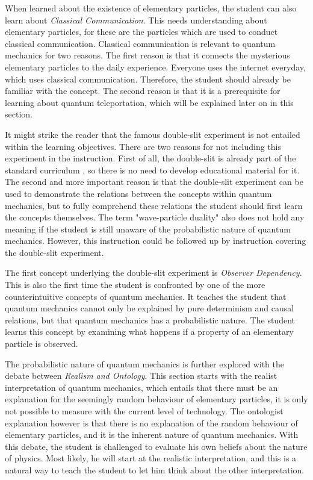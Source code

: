\documentclass[11pt,twoside]{report} %
\begin{document}
When learned about the existence of elementary particles, the student can also learn about \emph{Classical Communication}. This needs understanding about elementary particles, for these are the particles which are used to conduct classical communication. Classical communication is relevant to quantum mechanics for two reasons. The first reason is that it connects the mysterious elementary particles to the daily experience. Everyone uses the internet everyday, which uses classical communication. Therefore, the student should already be familiar with the concept. The second reason is that it is a prerequisite for learning about quantum teleportation, which will be explained later on in this section.

It might strike the reader that the famous double-slit experiment is not entailed within the learning objectives. There are two reasons for not including this experiment in the instruction. First of all, the double-slit is already part of the standard curriculum \cite{eindexamen2015}, so there is no need to develop educational material for it. The second and more important reason is that the double-slit experiment can be used to demonstrate the relations between the concepts within quantum mechanics, but to fully comprehend these relations the student should first learn the concepts themselves. The term "wave-particle duality" also does not hold any meaning if the student is still unaware of the probabilistic nature of quantum mechanics. However, this instruction could be followed up by instruction covering the double-slit experiment.

The first concept underlying the double-slit experiment is \emph{Observer Dependency}. This is also the first time the student is confronted by one of the more counterintuitive concepts of quantum mechanics. It teaches the student that quantum mechanics cannot only be explained by pure determinism and causal relations, but that quantum mechanics has a probabilistic nature. The student learns this concept by examining what happens if a property of an elementary particle is observed.

The probabilistic nature of quantum mechanics is further explored with the debate between \emph{Realism and Ontology}. This section starts with the realist interpretation of quantum mechanics, which entails that there must be an explanation for the seemingly random behaviour of elementary particles, it is only not possible to measure with the current level of technology. The ontologist explanation however is that there is no explanation of the random behaviour of elementary particles, and it is the inherent nature of quantum mechanics. With this debate, the student is challenged to evaluate his own beliefs about the nature of physics. Most likely, he will start at the realistic interpretation, and this is a natural way to teach the student to let him think about the other interpretation.
\end{document}
